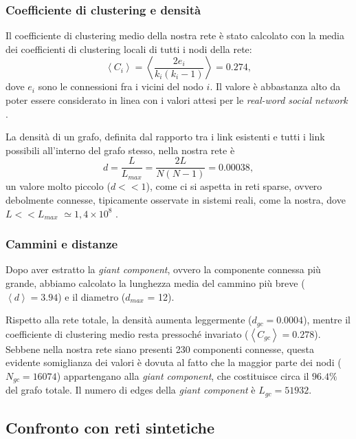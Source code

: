         \subsubsection{Coefficiente di clustering e densità}
        Il coefficiente di clustering medio della nostra rete è stato calcolato con la media dei coefficienti di clustering locali di tutti i nodi della rete:
        \begin{equation}
            \left< C_i \right> = \left< \frac{2e_i}{k_i(k_i-1)} \right>=0.274,
            \label{clustering_coefficient}
        \end{equation}
        dove $e_i$ sono le connessioni fra i vicini del nodo $i$. Il valore è abbastanza alto da poter essere considerato in linea con i valori attesi per le \textit{real-word social network} \cite{barabasicap3}.
        
        La densità di un grafo, definita dal rapporto tra i link esistenti e tutti i link possibili all’interno del grafo stesso, nella nostra rete è 
        \begin{equation}
            d =\frac{L}{L_{max}}=\frac{2L}{N(N-1)}=0.00038,
            \label{densità}
        \end{equation}
        un valore molto piccolo ($d<<1$), come ci si aspetta in reti sparse, ovvero debolmente connesse, tipicamente osservate in sistemi reali, come la nostra, dove $L << L_{max}$ $\simeq 1,4\times10^8$ \cite{barabasicap2}. 
    
    \subsubsection{Cammini e distanze}              
    Dopo aver estratto la \textit{giant component}, ovvero la componente connessa più grande, abbiamo calcolato la lunghezza media del cammino più breve ($\left< d \right> = 3.94$) e il diametro ($d_{max}$ = 12). 
        
    Rispetto alla rete totale, la densità aumenta leggermente ($d_{gc}=0.0004$), mentre il coefficiente di clustering medio resta pressoché invariato ($\left< C_{gc}\right>=0.278$). 
    Sebbene nella nostra rete siano presenti 230 componenti connesse, questa evidente somiglianza dei valori è dovuta al fatto che la maggior parte dei nodi ($N_{gc}=16074$) appartengano alla \textit{giant component}, che costituisce circa il $96.4\%$ del grafo totale. Il numero di edges della \textit{giant component} è $L_{gc}=51932$.
    
\subsection{Confronto con reti sintetiche}

